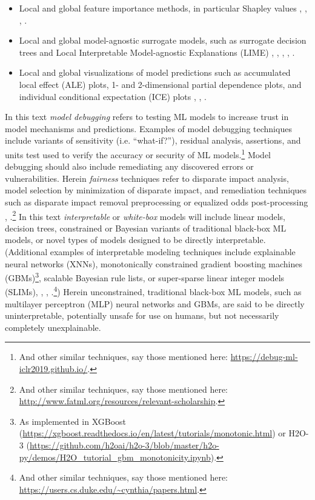 \documentclass[fleqn]{article}
\begin{document}
\begin{itemize}
\item Local and global feature importance methods, in particular Shapley values \cite{keinan2004fair}, \cite{shapley}, \cite{shapley1988shapley}, \cite{kononenko2010efficient}.
\item Local and global model-agnostic surrogate models, such as surrogate decision trees and Local Interpretable Model-agnostic Explanations (LIME) \cite{dt_surrogate2}, \cite{viper}, \cite{dt_surrogate1}, \cite{lime-sup}, \cite{lime}. 
\item Local and global visualizations of model predictions such as accumulated local effect (ALE) plots, 1- and 2-dimensional partial dependence plots, and individual conditional expectation (ICE) plots \cite{ale_plot}, \cite{esl}, \cite{ice_plots}.
\end{itemize}  

\noindent In this text \textit{model debugging} refers to testing ML models to increase trust in model mechanisms and predictions. Examples of model debugging techniques include variants of sensitivity (i.e. ``what-if?''), residual analysis, assertions, and units test used to verify the accuracy or security of ML models.\footnote{And other similar techniques, say those mentioned here: \url{https://debug-ml-iclr2019.github.io/}.} Model debugging should also include remediating any discovered errors or vulnerabilities. Herein \textit{fairness} techniques refer to disparate impact analysis, model selection by minimization of disparate impact, and remediation techniques such as disparate impact removal preprocessing or equalized odds post-processing \cite{feldman2015certifying}, \cite{hardt2016equality}.\footnote{And other similar techniques, say those mentioned here: \url{http://www.fatml.org/resources/relevant-scholarship}.} In this text \textit{interpretable} or \textit{white-box} models will include linear models, decision trees, constrained or Bayesian variants of traditional black-box ML models, or novel types of models designed to be directly interpretable. (Additional examples of interpretable modeling techniques include explainable neural networks (XNNs), monotonically constrained gradient boosting machines (GBMs)\footnote{As implemented in XGBoost (\url{https://xgboost.readthedocs.io/en/latest/tutorials/monotonic.html}) or H2O-3 (\url{https://github.com/h2oai/h2o-3/blob/master/h2o-py/demos/H2O_tutorial_gbm_monotonicity.ipynb}).}, scalable Bayesian rule lists, or super-sparse linear integer models (SLIMs), \cite{slim}, \cite{wf_xnn}, \cite{sbrl}.\footnote{And other similar techniques, say those mentioned here: \url{https://users.cs.duke.edu/~cynthia/papers.html}.}) Herein unconstrained, traditional black-box ML models, such as multilayer perceptron (MLP) neural networks and GBMs, are said to be directly uninterpretable, potentially unsafe for use on humans, but not necessarily completely unexplainable. 
\end{document}

